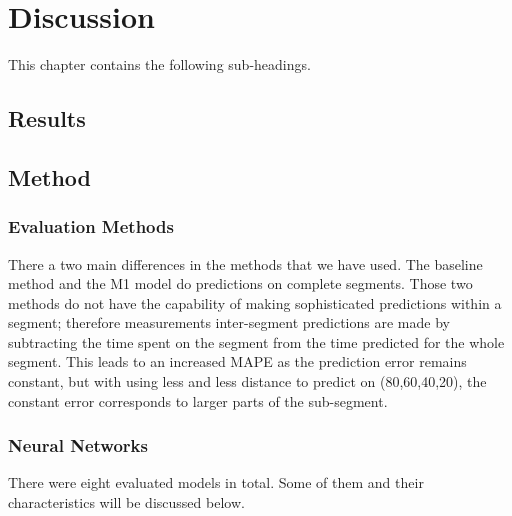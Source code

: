 
\chapter{Discussion}
\label{cha:discussion}

This chapter contains the following sub-headings.

\section{Results}
\label{sec:discussion-results}


\section{Method}
\label{sec:discussion-method}
\subsection{Evaluation Methods}
There a two main differences in the methods that we have used. The baseline method and the M1 model do predictions on complete segments. Those two methods do not have the capability of making sophisticated predictions within a segment; therefore measurements inter-segment predictions are made by subtracting the time spent on the segment from the time predicted for the whole segment. This leads to an increased MAPE as the prediction error remains constant, but with using less and less distance to predict on (80,60,40,20), the constant error corresponds to larger parts of the sub-segment.

\subsection{Neural Networks}
There were eight evaluated models in total. Some of them and their characteristics will be discussed below.

